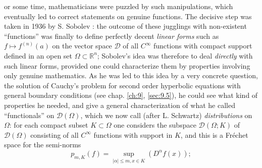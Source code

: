 \documentclass[12pt,a4paper,leqno,twoside]{extbook}
\newcommand{\R}{\mathbb{R}}
\begin{document}
or some time, mathematicians were puzzled by such manipulations, which eventually led to correct statements on genuine functions. The decisive step was taken in 1936 by S. Sobolev \cite{200}: the outcome of these jugglings with non-existent ``functions'' was finally to define perfectly decent \emph{linear forms} such as \(f \mapsto f^{(n)}(a)\) on the vector space \(\mathcal{D}\) of all \(C^\infty\) functions with compact support defined in an open set \(\Omega \subset \R^n\); Sobolev's idea was therefore to deal \emph{directly} with such linear forms, provided one could characterize them by properties involving only genuine mathematics. As he was led to this idea by a very concrete question, the solution of Cauchy's problem for second order hyperbolic equations with general boundary conditions (see chap. \ref{ch:9}, \ref{sec:9.5}), he could see what kind of properties he needed, and give a general characterization of what he called ``functionals'' on \(\mathcal{D}(\Omega)\), which we now call (after L. Schwartz) \emph{distributions} on \(\Omega\): for each compact subset \(K \subset \Omega\) one considers the subspace \(\mathcal{D}(\Omega; K)\) of \(\mathcal{D}(\Omega)\) consisting of all \(C^\infty\) functions with support in \(K\), and this is a Fréchet space for the semi-norms
\begin{equation}
    \label{eq:8.9}
    p_{m,K}(f) = \sup_{|\alpha| \leq m, x \in K}(D^\alpha f(x));
\end{equation}
\end{document}
